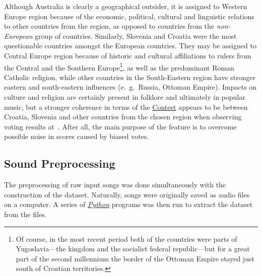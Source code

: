 \documentclass[conference, a4paper, 12pt]{IEEEtran}
\begin{document}
    Although Australia is clearly a geographical outsider, it is assigned to Western Europe region because of the economic, political, cultural and linguistic relations to other countries from the region, as opposed to countries from the \emph{non-European} group of countries. Similarly, Slovenia and Croatia were the most questionable countries amongst the European countries. They may be assigned to Central Europe region because of historic and cultural affiliations to rulers from the Central and the Southern Europe\footnote{Of course, in the most recent period both of the countries were parts of Yugoslavia---the kingdom and the socialist federal republic---but for a great part of the second millennium the border of the Ottoman Empire stayed just south of Croatian territories.}, as well as the predominant Roman Catholic religion, while other countries in the South-Eastern region have stronger eastern and south-eastern influences (e.~g.\ Russia, Ottoman Empire). Impacts on culture and religion are certainly present in folklore and ultimately in popular music, but a stronger coherence in terms of the \href{http://eurovision.tv/}{Contest} appears to be between Croatia, Slovenia and other countries from the chosen region when observing voting results at~\cite{bib:Okhuijsen2019,bib:Flecht2020,bib:EVWScores}. After all, the main purpose of the feature is to overcome possible noise in scores caused by biased votes.

    \par

    \subsection{Sound Preprocessing}
    \label{subsec:sound_preprocessing}

    The preprocessing of raw input songs was done simultaneously with the construction of the dataset. Naturally, songs were originally saved as audio files on a computer. A series of \href{http://docs.python.org/3/}{\emph{Python}} programs was then run to extract the dataset from the files.

    \par
\end{document}
